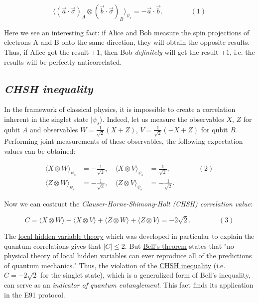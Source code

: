 \documentclass[11pt]{article}
\begin{document}
\[\langle (\vec{a} \cdot \vec{\sigma})_A \otimes (\vec{b} \cdot \vec{\sigma})_B \rangle_{\psi_s} =
-\vec{a} \cdot \vec{b}. \qquad\qquad (1)\]

Here we see an interesting fact: if Alice and Bob measure the spin
projections of electrons A and B onto the same direction, they will
obtain the opposite results. Thus, if Alice got the result \(\pm 1\),
then Bob \emph{definitely} will get the result \(\mp 1\), i.e. the
results will be perfectly anticorrelated.

    \subsection{\texorpdfstring{\emph{CHSH
inequality}}{CHSH inequality}}\label{chsh-inequality}

    In the framework of classical physics, it is impossible to create a
correlation inherent in the singlet state \(\lvert\psi_s\rangle\).
Indeed, let us measure the observables \(X\), \(Z\) for qubit \emph{A}
and observables \(W = \frac{1}{\sqrt{2}} (X + Z)\),
\(V = \frac{1}{\sqrt{2}} (-X + Z)\) for qubit \emph{B}. Performing joint
measurements of these observables, the following expectation values can
be obtained:

\begin{eqnarray*}
 \langle X \otimes W \rangle_{\psi_s} &= -\frac{1}{\sqrt{2}}, \quad 
 \langle X \otimes V \rangle_{\psi_s} &= \frac{1}{\sqrt{2}}, \qquad\qquad (2) \\
 \langle Z \otimes W \rangle_{\psi_s} &= -\frac{1}{\sqrt{2}}, \quad
 \langle Z \otimes V \rangle_{\psi_s} &= -\frac{1}{\sqrt{2}}.
\end{eqnarray*}

Now we can costruct the \emph{Clauser-Horne-Shimony-Holt (CHSH)
correlation value}:

\[C =
\langle X\otimes W \rangle - \langle X \otimes V \rangle + \langle Z \otimes W \rangle + \langle Z \otimes V \rangle =
-2 \sqrt{2}. \qquad\qquad (3)\]

The
\href{https://en.wikipedia.org/wiki/Local_hidden_variable_theory}{local
hidden variable theory} which was developed in particular to explain the
quantum correlations gives that \(\lvert C \rvert \leqslant 2\). But
\href{https://en.wikipedia.org/wiki/Bell's_theorem}{Bell's theorem}
states that "no physical theory of local hidden variables can ever
reproduce all of the predictions of quantum mechanics." Thus, the
violation of the
\href{https://en.wikipedia.org/wiki/Bell's_theorem\#Bell_inequalities_are_violated_by_quantum_mechanical_predictions}{CHSH
inequality} (i.e. \(C = -2 \sqrt{2}\) for the singlet state), which is a
generalized form of Bell's inequality, can serve as an \emph{indicator
of quantum entanglement}. This fact finds its application in the E91
protocol.
\end{document}
